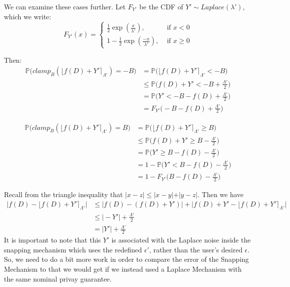 \documentclass[11pt]{scrartcl} %
\begin{document}
We can examine these cases further. Let $F_{Y'}$ be the CDF of $Y' \sim Laplace(\lambda')$, which we write:
\begin{equation}
	F_{Y'}(x) =
		\begin{cases}
			\frac{1}{2} \exp \left( \frac{x}{\lambda'} \right), &\text{ if } x < 0 \\
			1 - \frac{1}{2} \exp \left( \frac{-x}{\lambda'} \right), &\text{ if } x \geq 0
		\end{cases}
\end{equation}

Then:
\begin{align}
	               \mathbb{P} \big( clamp_B\left( \lfloor f(D) + Y' \rceil_{\Lambda'} \right) = -B \big) \nonumber &= \mathbb{P} \big( \lfloor f(D) + Y' \rceil_{\Lambda'} < -B \big) \nonumber \\
	&\leq \mathbb{P} \big( f(D) + Y' < -B + \frac{\Lambda'}{2} \big) \nonumber \\
	&= \mathbb{P} \big( Y' < -B - f(D) + \frac{\Lambda'}{2} \big) \nonumber \\
	&= F_{Y'} \big( -B - f(D) + \frac{\Lambda'}{2} \big) \nonumber
\end{align}

\begin{align}
	               \mathbb{P} \big( clamp_B\left( \lfloor f(D) + Y' \rceil_{\Lambda'} \right) = B \big) \nonumber &= \mathbb{P} \big( \lfloor f(D) + Y' \rceil_{\Lambda'} \geq B \big) \nonumber \\
	&\leq \mathbb{P} \big( f(D) + Y' \geq B - \frac{\Lambda'}{2} \big) \nonumber \\
	&= \mathbb{P} \big( Y' \geq B - f(D) - \frac{\Lambda'}{2} \big) \nonumber \\
	&= 1 - \mathbb{P} \big( Y' < B - f(D) - \frac{\Lambda'}{2} \big) \nonumber \\
	&= 1 - F_{Y'} \big( B - f(D) - \frac{\Lambda'}{2} \big) \nonumber
\end{align}

Recall from the triangle inequality that $\vert x-z \vert \leq \vert x-y \vert + \vert y-z \vert$. Then we have
\begin{align}
\big\vert f(D) - \lfloor f(D) + Y' \rceil_{\Lambda'} \big\vert \nonumber &\leq \big\vert f(D) - (f(D) + Y') \big\vert + \big\vert f(D) + Y' - \lfloor f(D) + Y' \rceil_{\Lambda'} \big\vert \nonumber \\
                                                                        &\leq \vert -Y' \vert + \frac{\Lambda'}{2} \nonumber \\
	                                                                    &= \vert Y' \vert + \frac{\Lambda'}{2} \nonumber
\end{align}
It is important to note that this $Y'$ is associated with the Laplace noise inside the snapping mechanism which uses the redefined $\epsilon'$, rather than the user's desired $\epsilon$. So, we need to do a bit more work in order to compare the error of the Snapping Mechanism to that we would get if we instead used a Laplace Mechanism with the same nominal privay guarantee. \newline
\end{document}
